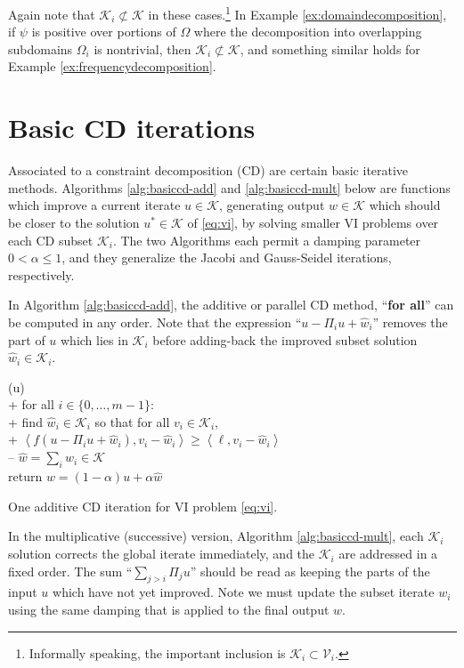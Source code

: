 \documentclass[letterpaper,final,12pt,reqno]{amsart}
\theoremstyle{cstyle}
\theoremstyle{cstyle*}
\theoremstyle{dstyle}
\numberwithin{equation}{section}
\numberwithin{figure}{section}
\numberwithin{table}{section}
\numberwithin{theorem}{section}
\newcommand{\cK}{\mathcal{K}}
\newcommand{\cV}{\mathcal{V}}
\newcommand{\ip}[2]{\left<#1,#2\right>}
\begin{document}
Again note that $\cK_i \not\subset \cK$ in these cases.\footnote{Informally speaking, the important inclusion is $\cK_i \subset \cV_i$.}  In Example \ref{ex:domaindecomposition}, if $\psi$ is positive over portions of $\Omega$ where the decomposition into overlapping subdomains $\Omega_i$ is nontrivial, then $\cK_i \not\subset \cK$, and something similar holds for Example \ref{ex:frequencydecomposition}.


\section{Basic CD iterations} \label{sec:cditers}

Associated to a constraint decomposition (CD) are certain basic iterative methods.  Algorithms \ref{alg:basiccd-add} and \ref{alg:basiccd-mult} below are functions which improve a current iterate $u \in \cK$, generating output $w\in\cK$ which should be closer to the solution $u^* \in \cK$ of \eqref{eq:vi}, by solving smaller VI problems over each CD subset $\cK_i$.   The two Algorithms each permit a damping parameter $0<\alpha\le 1$, and they generalize the Jacobi and Gauss-Seidel iterations, respectively.

In Algorithm \ref{alg:basiccd-add}, the additive or parallel CD method, ``\textbf{for all}'' can be computed in any order.  Note that the expression ``$u-\Pi_iu+\hat w_i$'' removes the part of $u$ which lies in $\mathcal{K}_i$ before adding-back the improved subset solution $\hat w_i \in \mathcal{K}_i$.

\begin{pseudofloat}[H]
\begin{pseudo*}
(u)\text{:} \\+
    for all $i \in \{0,\dots,m-1\}$: \\+
        \rm{find} $\hat w_i\in \cK_i$ \rm{so that for all} $v_i\in \cK_i$, \\+
            $\boxed{\ip{f(u - \Pi_i u + \hat w_i)}{v_i-\hat w_i} \ge \ip{\ell}{v_i-\hat w_i}}$ \\--
    $\hat w = \sum_i \hat w_i\in\cK$ \\
    return $w=(1-\alpha) u + \alpha \hat w$
\end{pseudo*}
\caption{One additive CD iteration for VI problem \eqref{eq:vi}.}
\label{alg:basiccd-add}
\end{pseudofloat}

In the multiplicative (successive) version, Algorithm \ref{alg:basiccd-mult}, each $\mathcal{K}_i$ solution corrects the global iterate immediately, and the $\mathcal{K}_i$ are addressed in a fixed order.  The sum ``$\sum_{j>i} \Pi_j u$'' should be read as keeping the parts of the input $u$ which have not yet improved.   Note we must update the subset iterate $w_i$ using the same damping that is applied to the final output $w$.
\end{document}
